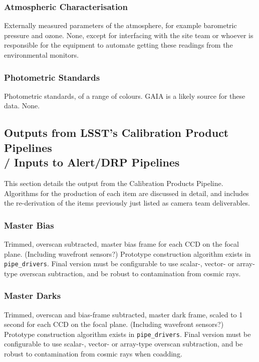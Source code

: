 \subsubsection{Atmospheric Characterisation}\label{sec:calibInputs:atmosphericData}
Externally measured parameters of the atmosphere, for example barometric pressure and ozone.
\alg None, except for interfacing with the site team or whoever is responsible for the equipment to automate getting these readings from the environmental monitors.


\subsubsection{Photometric Standards}\label{sec:calibInputs:photometricStandards} 
Photometric standards, of a range of colours. GAIA is a likely source for these data.
\alg None.



\subsection{Outputs from LSST's Calibration Product Pipelines \\
	/ Inputs to Alert/DRP Pipelines}
\label{sec:calibProducts}

This section details the output from the Calibration Products Pipeline. Algorithms for the production of each item are discussed in detail, and includes the re-derivation of the items previously just listed as camera team deliverables.


\subsubsection{Master Bias}\label{calibProducts:bias}
Trimmed, overscan subtracted, master bias frame for each CCD on the focal plane. \rednote (Including wavefront sensors?)
\alg Prototype construction algorithm exists in \texttt{pipe\_drivers}. Final version must be configurable to use scalar-, vector- or array-type overscan subtraction, and be robust to contamination from cosmic rays.


\subsubsection{Master Darks}\label{calibProducts:dark}
Trimmed, overscan and bias-frame subtracted, master dark frame, scaled to 1 second for each CCD on the focal plane. \rednote (Including wavefront sensors?)
\alg Prototype construction algorithm exists in \texttt{pipe\_drivers}. Final version must be configurable to use scalar-, vector- or array-type overscan subtraction, and be robust to contamination from cosmic rays when coadding.


